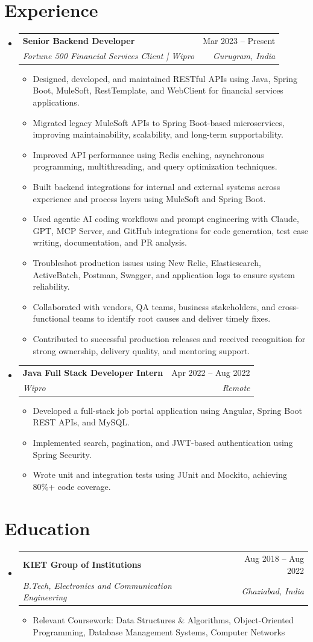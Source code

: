 \documentclass[letterpaper,11pt]{article}
\makeatletter
\newcommand{\resumeItem}[1]{
  \item\small{
    {#1 \vspace{-2pt}}
  }
}
\newcommand{\resumeSubheading}[4]{
  \vspace{-2pt}\item
    \begin{tabular*}{0.97\textwidth}[t]{l@{\extracolsep{\fill}}r}
      \textbf{#1} & #2 \\
      \textit{\small#3} & \textit{\small #4} \\
    \end{tabular*}\vspace{-7pt}
}
\newcommand{\resumeSubHeadingListStart}{\begin{itemize}[leftmargin=0.15in, label={}]}
\newcommand{\resumeSubHeadingListEnd}{\end{itemize}}
\newcommand{\resumeItemListStart}{\begin{itemize}}
\newcommand{\resumeItemListEnd}{\end{itemize}\vspace{-5pt}}
\makeatother
\begin{document}
\section{Experience}
  \resumeSubHeadingListStart

    \resumeSubheading
      {Senior Backend Developer}{Mar 2023 -- Present}
      {Fortune 500 Financial Services Client | Wipro}{Gurugram, India}
      \resumeItemListStart
          \resumeItem{Designed, developed, and maintained RESTful APIs using Java, Spring Boot, MuleSoft, RestTemplate, and WebClient for financial services applications.}
          \resumeItem{Migrated legacy MuleSoft APIs to Spring Boot-based microservices, improving maintainability, scalability, and long-term supportability.}
          \resumeItem{Improved API performance using Redis caching, asynchronous programming, multithreading, and query optimization techniques.}
          \resumeItem{Built backend integrations for internal and external systems across experience and process layers using MuleSoft and Spring Boot.}
          \resumeItem{Used agentic AI coding workflows and prompt engineering with Claude, GPT, MCP Server, and GitHub integrations for code generation, test case writing, documentation, and PR analysis.}
          \resumeItem{Troubleshot production issues using New Relic, Elasticsearch, ActiveBatch, Postman, Swagger, and application logs to ensure system reliability.}
          \resumeItem{Collaborated with vendors, QA teams, business stakeholders, and cross-functional teams to identify root causes and deliver timely fixes.}
          \resumeItem{Contributed to successful production releases and received recognition for strong ownership, delivery quality, and mentoring support.}
      \resumeItemListEnd

    \resumeSubheading
      {Java Full Stack Developer Intern}{Apr 2022 -- Aug 2022}
      {Wipro}{Remote}
      \resumeItemListStart
          \resumeItem{Developed a full-stack job portal application using Angular, Spring Boot REST APIs, and MySQL.}
          \resumeItem{Implemented search, pagination, and JWT-based authentication using Spring Security.}
          \resumeItem{Wrote unit and integration tests using JUnit and Mockito, achieving 80\%+ code coverage.}
      \resumeItemListEnd

  \resumeSubHeadingListEnd

\section{Education}
  \resumeSubHeadingListStart
    \resumeSubheading
      {KIET Group of Institutions}{Aug 2018 -- Aug 2022}
      {B.Tech, Electronics and Communication Engineering}{Ghaziabad, India}
      \resumeItemListStart
        \resumeItem{Relevant Coursework: Data Structures \& Algorithms, Object-Oriented Programming, Database Management Systems, Computer Networks}
      \resumeItemListEnd
  \resumeSubHeadingListEnd
\end{document}
